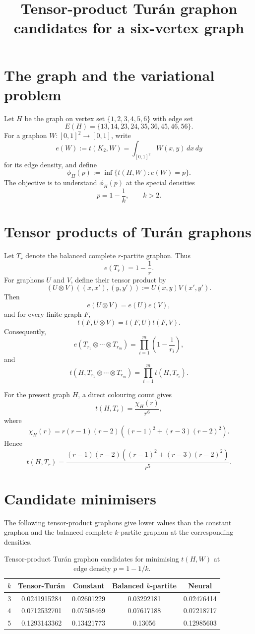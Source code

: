 \documentclass[11pt]{article}
\title{Tensor-product Tur\'an graphon candidates for a six-vertex graph}
\author{}
\date{}
\begin{document}
\maketitle

\section{The graph and the variational problem}

Let $H$ be the graph on vertex set $\{1,2,3,4,5,6\}$ with edge set
\[
E(H)=\{13,14,23,24,35,36,45,46,56\}.
\]
For a graphon $W:[0,1]^2\to[0,1]$, write
\[
e(W):=t(K_2,W)=\int_{[0,1]^2}W(x,y)\,dx\,dy
\]
for its edge density, and define
\[
\phi_H(p):=\inf\{t(H,W): e(W)=p\}.
\]
The objective is to understand $\phi_H(p)$ at the special densities
\[
p=1-\frac1k,
\qquad k>2.
\]

\section{Tensor products of Tur\'an graphons}

Let $T_r$ denote the balanced complete $r$-partite graphon. Thus
\[
e(T_r)=1-\frac1r.
\]
For graphons $U$ and $V$, define their tensor product by
\[
(U\otimes V)((x,x'),(y,y')):=U(x,y)V(x',y').
\]
Then
\[
e(U\otimes V)=e(U)e(V),
\]
and for every finite graph $F$,
\[
t(F,U\otimes V)=t(F,U)t(F,V).
\]
Consequently,
\[
e(T_{r_1}\otimes\cdots\otimes T_{r_m})
=
\prod_{i=1}^m\left(1-\frac1{r_i}\right),
\]
and
\[
t(H,T_{r_1}\otimes\cdots\otimes T_{r_m})
=
\prod_{i=1}^m t(H,T_{r_i}).
\]

For the present graph $H$, a direct colouring count gives
\[
t(H,T_r)=\frac{\chi_H(r)}{r^6},
\]
where
\[
\chi_H(r)
=
r(r-1)(r-2)
\left((r-1)^2+(r-3)(r-2)^2\right).
\]
Hence
\[
\boxed{
 t(H,T_r)
 =
 \frac{(r-1)(r-2)\left((r-1)^2+(r-3)(r-2)^2\right)}{r^5}.
}
\]

\section{Candidate minimisers}

The following tensor-product graphons give lower values than the constant graphon and the balanced complete $k$-partite graphon at the corresponding densities.

\begin{table}[h]
\centering
\begin{tabular}{@{}ccccc@{}}
\toprule
$k$ & Tensor-Tur\'an & Constant & Balanced $k$-partite & Neural \\
\midrule
$3$ & 0.0241915284 & 0.02601229 & 0.03292181 & 0.02476414
\\
$4$ & 0.0712532701 & 0.07508469 & 0.07617188 & 0.07218717
\\
$5$ & 0.1293143362 & 0.13421773 & 0.13056 &  0.12985603
\\
\bottomrule
\end{tabular}
\caption{Tensor-product Tur\'an graphon candidates for minimising $t(H,W)$ at edge density $p=1-1/k$.}
\end{table}
\end{document}
